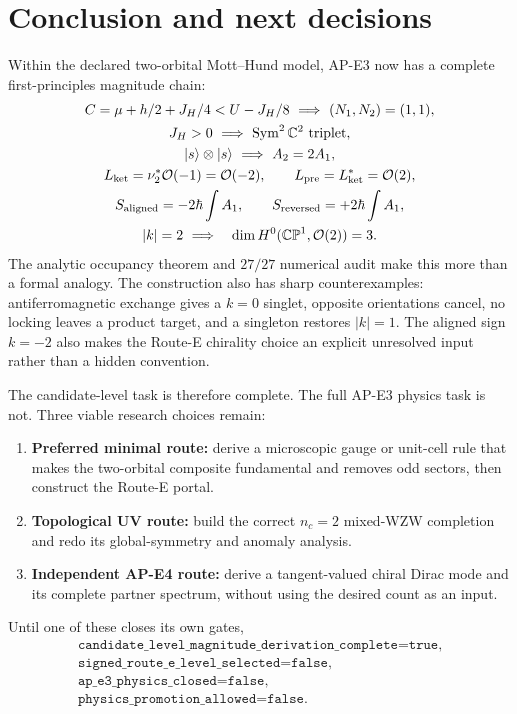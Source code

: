 \documentclass[11pt]{article}
\theoremstyle{definition}
\theoremstyle{remark}
\newcommand{\CP}{\mathbb{CP}}
\newcommand{\CC}{\mathbb{C}}
\newcommand{\cO}{\mathcal O}
\newcommand{\Sym}{\operatorname{Sym}}
\newcommand{\ket}[1]{\lvert #1\rangle}
\begin{document}
\section{Conclusion and next decisions}

Within the declared two-orbital Mott--Hund model, AP-E3 now has a complete
first-principles magnitude chain:
\begin{equation}
 \begin{gathered}
 C=\mu+h/2+J_H/4<U-J_H/8
 \ \Longrightarrow\ (N_1,N_2)=(1,1),\\
 J_H>0\ \Longrightarrow\ \Sym^2\CC^2\text{ triplet},\\
 \ket{s}\otimes\ket{s}\ \Longrightarrow\ A_2=2A_1,\\
 L_{\rm ket}=\nu_2^*\cO(-1)=\cO(-2),\qquad
 L_{\rm pre}=L_{\rm ket}^*=\cO(2),\\
 S_{\rm aligned}=-2\hbar\int A_1,\qquad
 S_{\rm reversed}=+2\hbar\int A_1,\\
 |k|=2\ \Longrightarrow\quad
 \dim H^0(\CP^1,\cO(2))=3.
 \end{gathered}
 \label{eq:final-chain}
\end{equation}
The analytic occupancy theorem and \(27/27\) numerical audit make this more than
a formal analogy.  The construction also has sharp counterexamples:
antiferromagnetic exchange gives a \(k=0\) singlet, opposite orientations
cancel, no locking leaves a product target, and a singleton restores
\(|k|=1\).  The aligned sign \(k=-2\) also makes the Route-E chirality choice
an explicit unresolved input rather than a hidden convention.

The candidate-level task is therefore complete.  The full AP-E3 physics task
is not.  Three viable research choices remain:
\begin{enumerate}
\item \textbf{Preferred minimal route:} derive a microscopic gauge or
  unit-cell rule that makes the two-orbital composite fundamental and removes
  odd sectors, then construct the Route-E portal.
\item \textbf{Topological UV route:} build the correct \(n_c=2\) mixed-WZW
  completion and redo its global-symmetry and anomaly analysis.
\item \textbf{Independent AP-E4 route:} derive a tangent-valued chiral Dirac
  mode and its complete partner spectrum, without using the desired count as
  an input.
\end{enumerate}
Until one of these closes its own gates,
\begin{equation}
 \boxed{\begin{gathered}
 \texttt{candidate\_level\_magnitude\_derivation\_complete=true},\\
 \texttt{signed\_route\_e\_level\_selected=false},\\
 \texttt{ap\_e3\_physics\_closed=false},\\
 \texttt{physics\_promotion\_allowed=false}.
 \end{gathered}}
\end{equation}



\end{document}
